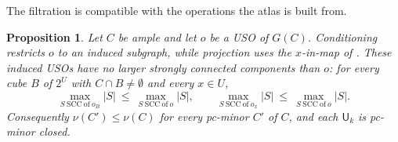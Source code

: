 \documentclass[11pt]{article}
\newtheorem{proposition}{Proposition}[section]
\theoremstyle{definition}
\begin{document}
The filtration is compatible with the operations the atlas is built from.

\begin{proposition}\label{prop:width-minor-closed}
Let $C$ be ample and let $o$ be a USO of $G(C)$. Conditioning restricts
$o$ to an induced subgraph, while projection uses the $x$-in-map of
\cite[Proposition~6.14(3)]{CCMW}. These induced USOs have no larger strongly
connected components than $o$: for every cube $B$ of $2^{U}$ with
$C\cap B\ne\emptyset$ and every $x\in U$,
\[
  \max_{S\ \mathrm{SCC}\ \mathrm{of}\ o_{B}}|S|\ \le\
  \max_{S\ \mathrm{SCC}\ \mathrm{of}\ o}|S|,
  \qquad
  \max_{S\ \mathrm{SCC}\ \mathrm{of}\ o_{x}}|S|\ \le\
  \max_{S\ \mathrm{SCC}\ \mathrm{of}\ o}|S| .
\]
Consequently $\nu(C')\le\nu(C)$ for every pc-minor $C'$ of $C$, and each
$\mathsf{U}_{k}$ is pc-minor closed.
\end{proposition}
\end{document}
